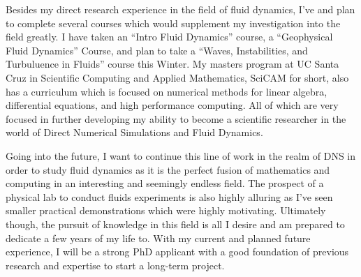 \documentclass{article}
\begin{document}
Besides my direct research experience in the field of fluid dynamics, I've and plan to complete several courses which would supplement my investigation into the field greatly. I have taken an ``Intro Fluid Dynamics'' course, a ``Geophysical Fluid Dynamics'' Course, and plan to take a ``Waves, Instabilities, and Turbuluence in Fluids'' course this Winter. My masters program at UC Santa Cruz in Scientific Computing and Applied Mathematics, SciCAM for short, also has a curriculum which is focused on numerical methods for linear algebra, differential equations, and high performance computing. All of which are very focused in further developing my ability to become a scientific researcher in the world of Direct Numerical Simulations and Fluid Dynamics. 

Going into the future, I want to continue this line of work in the realm of DNS in order to study fluid dynamics as it is the perfect fusion of mathematics and computing in an interesting and seemingly endless field. The prospect of a physical lab to conduct fluids experiments is also highly alluring as I've seen smaller practical demonstrations which were highly motivating. Ultimately though, the pursuit of knowledge in this field is all I desire and am prepared to dedicate a few years of my life to. With my current and planned future experience, I will be a strong PhD applicant with a good foundation of previous research and expertise to start a long-term project. 
\end{document}
